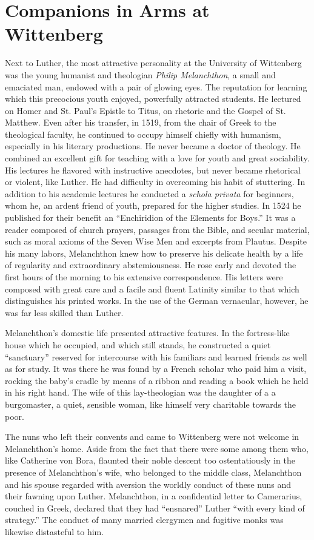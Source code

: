 \section{Companions in Arms at Wittenberg}

Next to Luther, the most attractive personality at the University
of Wittenberg was the young humanist and theologian \textit{Philip Melanchthon},
a small and emaciated man, endowed with a pair of
glowing eyes. The reputation for learning which this precocious
youth enjoyed, powerfully attracted students. He lectured on Homer
and St. Paul’s Epistle to Titus, on rhetoric and the Gospel of St.
Matthew. Even after his transfer, in 1519, from the chair of Greek
to the theological faculty, he continued to occupy himself chiefly
with humanism, especially in his literary productions. He never
became a doctor of theology. He combined an excellent gift for
teaching with a love for youth and great sociability. His lectures
he flavored with instructive anecdotes, but never became rhetorical
or violent, like Luther. He had difficulty in overcoming his habit
of stuttering. In addition to his academic lectures he conducted a
\textit{schola privata} for beginners, whom he, an ardent friend of youth,
prepared for the higher studies. In 1524 he published for their
benefit an “Enchiridion of the Elements for Boys.” It was a reader
composed of church prayers, passages from the Bible, and secular
material, such as moral axioms of the Seven Wise Men and excerpts from
Plautus. Despite his many labors, Melanchthon knew
how to preserve his delicate health by a life of regularity and extraordinary
abstemiousness. He rose early and devoted the first
hours of the morning to his extensive correspondence. His letters
were composed with great care and a facile and fluent Latinity
similar to that which distinguishes his printed works. In the use
of the German vernacular, however, he was far less skilled than
Luther.

Melanchthon’s domestic life presented attractive features. In the
fortress-like house which he occupied, and which still stands, he
constructed a quiet “sanctuary” reserved for intercourse with his
familiars and learned friends as well as for study. It was there he was
found by a French scholar who paid him a visit, rocking the baby’s
cradle by means of a ribbon and reading a book which he held in his
right hand. The wife of this lay-theologian was the daughter of a a
burgomaster, a quiet, sensible woman, like himself very charitable
towards the poor.

The nuns who left their convents and came to Wittenberg
were not welcome in Melanchthon’s home. Aside from the fact that
there were some among them who, like Catherine von Bora, flaunted
their noble descent too ostentatiously in the presence of Melanchthon’s
wife, who belonged to the middle class, Melanchthon and
his spouse regarded with aversion the worldly conduct of these
nuns and their fawning upon Luther. Melanchthon, in a confidential
letter to Camerarius, couched in Greek, declared that they had “ensnared”
Luther “with every kind of strategy.” The conduct of many
married clergymen and fugitive monks was likewise distasteful
to him.

